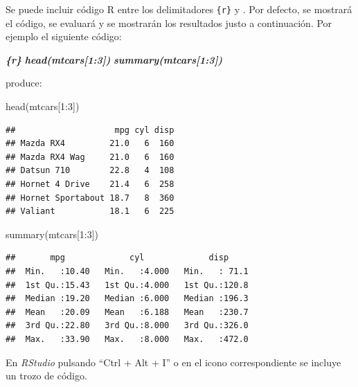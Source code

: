 \documentclass[
]{book}
\newenvironment{Shaded}{\begin{snugshade}}{\end{snugshade}}
\newcommand{\DecValTok}[1]{\textcolor[rgb]{0.00,0.00,0.81}{#1}}
\newcommand{\FunctionTok}[1]{\textcolor[rgb]{0.00,0.00,0.00}{#1}}
\newcommand{\InformationTok}[1]{\textcolor[rgb]{0.56,0.35,0.01}{\textbf{\textit{#1}}}}
\newcommand{\NormalTok}[1]{#1}
\newcommand{\SpecialCharTok}[1]{\textcolor[rgb]{0.00,0.00,0.00}{#1}}
\theoremstyle{definition}
\theoremstyle{definition}
\theoremstyle{definition}
\theoremstyle{definition}
\theoremstyle{remark}
\begin{document}
Se puede incluir código R entre los delimitadores \texttt{\textasciigrave{}\textasciigrave{}\textasciigrave{}\{r\}} y \texttt{\textasciigrave{}\textasciigrave{}\textasciigrave{}}.
Por defecto, se mostrará el código, se evaluará y se mostrarán los resultados justo a continuación.
Por ejemplo el siguiente código:

\begin{Shaded}
\begin{Highlighting}[]
\InformationTok{\textasciigrave{}\textasciigrave{}\textasciigrave{}\{r\}}
\InformationTok{head(mtcars[1:3])}
\InformationTok{summary(mtcars[1:3])}
\InformationTok{\textasciigrave{}\textasciigrave{}\textasciigrave{}}
\end{Highlighting}
\end{Shaded}

produce:

\begin{Shaded}
\begin{Highlighting}[]
\FunctionTok{head}\NormalTok{(mtcars[}\DecValTok{1}\SpecialCharTok{:}\DecValTok{3}\NormalTok{])}
\end{Highlighting}
\end{Shaded}

\begin{verbatim}
##                    mpg cyl disp
## Mazda RX4         21.0   6  160
## Mazda RX4 Wag     21.0   6  160
## Datsun 710        22.8   4  108
## Hornet 4 Drive    21.4   6  258
## Hornet Sportabout 18.7   8  360
## Valiant           18.1   6  225
\end{verbatim}

\begin{Shaded}
\begin{Highlighting}[]
\FunctionTok{summary}\NormalTok{(mtcars[}\DecValTok{1}\SpecialCharTok{:}\DecValTok{3}\NormalTok{])}
\end{Highlighting}
\end{Shaded}

\begin{verbatim}
##       mpg             cyl             disp      
##  Min.   :10.40   Min.   :4.000   Min.   : 71.1  
##  1st Qu.:15.43   1st Qu.:4.000   1st Qu.:120.8  
##  Median :19.20   Median :6.000   Median :196.3  
##  Mean   :20.09   Mean   :6.188   Mean   :230.7  
##  3rd Qu.:22.80   3rd Qu.:8.000   3rd Qu.:326.0  
##  Max.   :33.90   Max.   :8.000   Max.   :472.0
\end{verbatim}

En \emph{RStudio} pulsando ``Ctrl + Alt + I'' o en el icono correspondiente se incluye un trozo de código.
\end{document}
